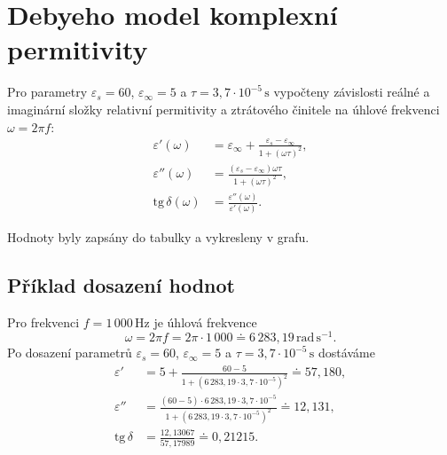 \documentclass[11pt,a4paper]{article}
\begin{document}
\section{Debyeho model komplexní permitivity}
Pro parametry $\varepsilon_s=60$, $\varepsilon_\infty=5$ a
$\tau=3{,}7\cdot10^{-5}\,\mathrm{s}$ vypočteny
závislosti reálné a imaginární složky relativní permitivity a
ztrátového činitele na úhlové frekvenci $\omega=2\pi f$:
\begin{align}
\varepsilon'(\omega)&=\varepsilon_\infty+\frac{\varepsilon_s-\varepsilon_\infty}{1+(\omega\tau)^2},\\
\varepsilon''(\omega)&=\frac{(\varepsilon_s-\varepsilon_\infty)\omega\tau}{1+(\omega\tau)^2},\\
\mathrm{tg}\,\delta(\omega)&=\frac{\varepsilon''(\omega)}{\varepsilon'(\omega)}.
\end{align}

Hodnoty byly zapsány do tabulky a vykresleny v grafu.

\subsection*{Příklad dosazení hodnot}
Pro frekvenci $f=1\,000\,\mathrm{Hz}$ je úhlová frekvence
\begin{equation}
\omega=2\pi f=2\pi\cdot 1\,000
\doteq 6\,283{,}19\,\mathrm{rad\,s^{-1}}.
\end{equation}
Po dosazení parametrů $\varepsilon_s=60$, $\varepsilon_\infty=5$
a $\tau=3{,}7\cdot10^{-5}\,\mathrm{s}$ dostáváme
\begin{align}
\varepsilon' & = 5+\frac{60-5}{1+(6\,283{,}19\cdot 3{,}7\cdot10^{-5})^2}
\doteq 57{,}180,\\[4pt]
\varepsilon'' & = \frac{(60-5)\cdot6\,283{,}19\cdot3{,}7\cdot10^{-5}}{1+(6\,283{,}19\cdot3{,}7\cdot10^{-5})^2}
\doteq 12{,}131,\\[4pt]
\mathrm{tg}\,\delta & =\frac{12{,}13067}{57{,}17989}\doteq 0{,}21215.
\end{align}
\end{document}
